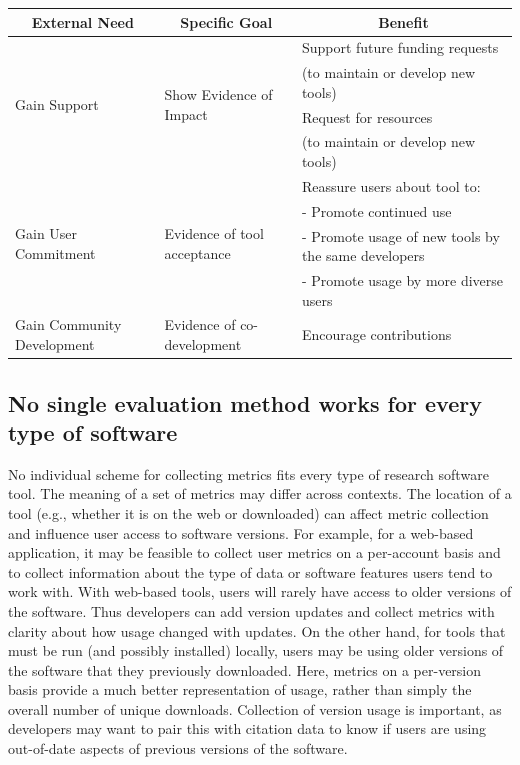\documentclass{article}
\begin{document}
\begin{table}[ht!]
\begin{tabular} {|p{}|p{}|p{}|}
    \hline
    \multicolumn{1}{|c|}{\cellcolor[gray]{.9} \textbf{External Need}} 
    & \multicolumn{1}{|c|}{\cellcolor[gray]{.9} \textbf{Specific Goal}}
    & \multicolumn{1}{|c|}{\cellcolor[gray]{.9} \textbf{Benefit}}\\[1.1ex] %
    \hline
    \multirow{4}{*}{Gain Support}              
    & \multirow{4}{*}{Show Evidence of Impact} & 
    Support future funding requests \\
    & &
    (to maintain or develop new tools) \\
    & &
    Request for resources  \\
    & & 
    (to maintain or develop new tools) \\[1.1ex]
    \hline
    \multirow{4}{*}{Gain User Commitment} 
    & \multirow{4}{*}{Evidence of tool acceptance} & 
    Reassure users about tool to:\\
    &&
    - Promote continued use\\
    && 
    - Promote usage of new tools by the same developers \\ 
    &&
    - Promote usage by more diverse users \\[1.1ex]
    \hline
    \multirow{1}{*}{Gain Community Development} 
    & \multirow{1}{*}{Evidence of co-development} & 
    Encourage contributions  \\
    \hline
  \end{tabular}
  \label{tab:benefit_table}
\end{table}

\subsection{No single evaluation method works for every type of software}
\label{sec:no_one_way}
No individual scheme for collecting metrics fits every type of research software tool.  The meaning of a set of metrics may differ across contexts. The location of a tool (e.g., whether it is on the web or downloaded) can affect metric collection and influence user access to software versions. For example, for a web-based application, it may be feasible to collect user metrics on a per-account basis and to collect information about the type of data or software features users tend to work with. With web-based tools, users will rarely have access to older versions of the software. Thus developers can add version updates and collect metrics with clarity about how usage changed with updates. On the other hand, for tools that must be run (and possibly installed)  locally, users may be using older versions of the software that they previously downloaded.  Here, metrics on a per-version basis provide a much better representation of usage, rather than simply the overall number of unique downloads. Collection of version usage is important, as developers may want to pair this with citation data to know if users are using out-of-date aspects of previous versions of the software.
\end{document}
